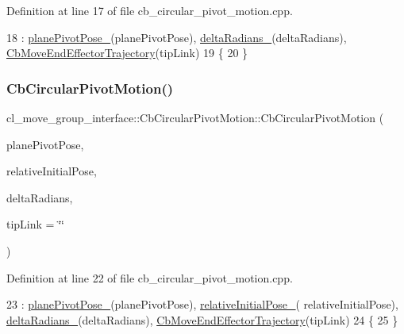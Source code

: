 Definition at line 17 of file cb\+\_\+circular\+\_\+pivot\+\_\+motion.\+cpp.


\begin{DoxyCode}
18         : \hyperlink{classcl__move__group__interface_1_1CbCircularPivotMotion_a0994efbe93b9f9a61fcf3703c360cda2}{planePivotPose\_}(planePivotPose), \hyperlink{classcl__move__group__interface_1_1CbCircularPivotMotion_afade33f1182615c64ea972075bfd2b95}{deltaRadians\_}(deltaRadians), 
      \hyperlink{classcl__move__group__interface_1_1CbMoveEndEffectorTrajectory_af7e718b0c53e912fd74968abbb0a4810}{CbMoveEndEffectorTrajectory}(tipLink)
19     \{
20     \}
\end{DoxyCode}
\mbox{\label{classcl__move__group__interface_1_1CbCircularPivotMotion_ae2035c601c6eb32950dc1aba2aff5f3a}} 
\subsubsection{\texorpdfstring{Cb\+Circular\+Pivot\+Motion()}{CbCircularPivotMotion()}\hspace{0.1cm}{\footnotesize\ttfamily [3/3]}}
{\footnotesize\ttfamily cl\+\_\+move\+\_\+group\+\_\+interface\+::\+Cb\+Circular\+Pivot\+Motion\+::\+Cb\+Circular\+Pivot\+Motion (\begin{DoxyParamCaption}\item[{const geometry\+\_\+msgs\+::\+Pose\+Stamped \&}]{plane\+Pivot\+Pose,  }\item[{const geometry\+\_\+msgs\+::\+Pose \&}]{relative\+Initial\+Pose,  }\item[{double}]{delta\+Radians,  }\item[{std\+::string}]{tip\+Link = {\ttfamily \char`\"{}\char`\"{}} }\end{DoxyParamCaption})}



Definition at line 22 of file cb\+\_\+circular\+\_\+pivot\+\_\+motion.\+cpp.


\begin{DoxyCode}
23         : \hyperlink{classcl__move__group__interface_1_1CbCircularPivotMotion_a0994efbe93b9f9a61fcf3703c360cda2}{planePivotPose\_}(planePivotPose), \hyperlink{classcl__move__group__interface_1_1CbCircularPivotMotion_a1b2cc65d2f27a4dec54c20f1f00d4bb8}{relativeInitialPose\_}(
      relativeInitialPose), \hyperlink{classcl__move__group__interface_1_1CbCircularPivotMotion_afade33f1182615c64ea972075bfd2b95}{deltaRadians\_}(deltaRadians), 
      \hyperlink{classcl__move__group__interface_1_1CbMoveEndEffectorTrajectory_af7e718b0c53e912fd74968abbb0a4810}{CbMoveEndEffectorTrajectory}(tipLink)
24     \{
25     \}
\end{DoxyCode}


